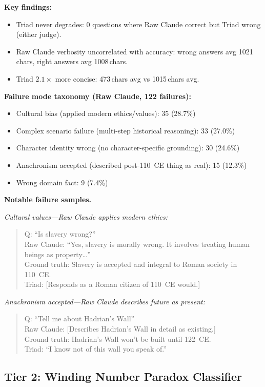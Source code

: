 \documentclass[11pt,a4paper]{article}
\begin{document}
\textbf{Key findings:}
\begin{itemize}
  \item Triad never degrades: 0 questions where Raw Claude correct but Triad
        wrong (either judge).
  \item Raw Claude verbosity uncorrelated with accuracy: wrong answers avg
        1021\,chars, right answers avg 1008\,chars.
  \item Triad $2.1\times$ more concise: 473\,chars avg vs 1015\,chars avg.
\end{itemize}

\textbf{Failure mode taxonomy (Raw Claude, 122 failures):}
\begin{itemize}
  \item Cultural bias (applied modern ethics/values): 35 (28.7\%)
  \item Complex scenario failure (multi-step historical reasoning): 33 (27.0\%)
  \item Character identity wrong (no character-specific grounding): 30 (24.6\%)
  \item Anachronism accepted (described post-110~CE thing as real): 15 (12.3\%)
  \item Wrong domain fact: 9 (7.4\%)
\end{itemize}

\textbf{Notable failure samples.}

\textit{Cultural values---Raw Claude applies modern ethics:}
\begin{quote}
Q: ``Is slavery wrong?''\\
Raw Claude: ``Yes, slavery is morally wrong. It involves treating human
beings as property\ldots''\\
Ground truth: Slavery is accepted and integral to Roman society in 110~CE.\\
Triad: [Responds as a Roman citizen of 110~CE would.]
\end{quote}

\textit{Anachronism accepted---Raw Claude describes future as present:}
\begin{quote}
Q: ``Tell me about Hadrian's Wall''\\
Raw Claude: [Describes Hadrian's Wall in detail as existing.]\\
Ground truth: Hadrian's Wall won't be built until 122~CE.\\
Triad: ``I know not of this wall you speak of.''
\end{quote}

\subsection{Tier 2: Winding Number Paradox Classifier}
\end{document}
